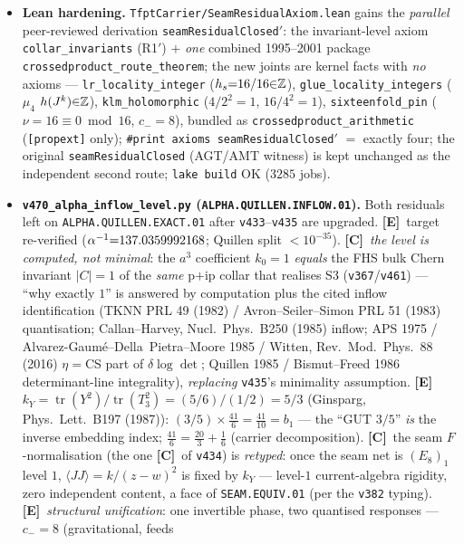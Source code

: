 \documentclass[11pt]{article}
\providecommand{\mE}{\textbf{[E]}}\providecommand{\mC}{\textbf{[C]}}
\begin{document}
\begin{itemize}
\item \textbf{Lean hardening.} \texttt{TfptCarrier/SeamResidualAxiom.lean} gains the \emph{parallel}
peer-reviewed derivation \texttt{seamResidualClosed$'$}: the invariant-level axiom
\texttt{collar\_invariants} (R1$'$) $+$ \emph{one} combined 1995--2001 package
\texttt{crossedproduct\_route\_theorem}; the new joints are kernel facts with \emph{no} axioms ---
\texttt{lr\_locality\_integer} ($h_s{=}16/16{\in}\mathbb{Z}$), \texttt{glue\_locality\_integers}
($\mu_4$ $h(J^k){\in}\mathbb{Z}$), \texttt{klm\_holomorphic} ($4/2^2{=}1$, $16/4^2{=}1$),
\texttt{sixteenfold\_pin} ($\nu{=}16{\equiv}0\bmod 16$, $c_-{=}8$), bundled as
\texttt{crossedproduct\_arithmetic} (\texttt{[propext]} only); \texttt{\#print axioms
seamResidualClosed$'$} $=$ exactly four; the original \texttt{seamResidualClosed} (AGT/AMT witness)
is kept unchanged as the independent second route; \texttt{lake build} OK ($3285$ jobs).
\item \textbf{\texttt{v470\_alpha\_inflow\_level.py} (\texttt{ALPHA.QUILLEN.INFLOW.01}).}
Both residuals left on \texttt{ALPHA.QUILLEN.EXACT.01} after \texttt{v433}--\texttt{v435} are
upgraded. \mE\ target re-verified ($\alpha^{-1}{=}137.0359992168$; Quillen split ${<}10^{-35}$).
\mC\ \emph{the level is computed, not minimal}: the $a^3$ coefficient $k_0{=}1$ \emph{equals} the
FHS bulk Chern invariant $|C|{=}1$ of the \emph{same} p$+$ip collar that realises S3
(\texttt{v367}/\texttt{v461}) --- ``why exactly $1$'' is answered by computation plus the cited
inflow identification (TKNN PRL 49 (1982) / Avron--Seiler--Simon PRL 51 (1983) quantisation;
Callan--Harvey, Nucl.\ Phys.\ B250 (1985) inflow; APS 1975 / Alvarez-Gaum\'e--Della~Pietra--Moore
1985 / Witten, Rev.\ Mod.\ Phys.\ 88 (2016) $\eta{=}$CS part of $\delta\log\det$; Quillen 1985 /
Bismut--Freed 1986 determinant-line integrality), \emph{replacing} \texttt{v435}'s minimality
assumption. \mE\ $k_Y{=}\operatorname{tr}(Y^2)/\operatorname{tr}(T_3^2){=}(5/6)/(1/2){=}5/3$
(Ginsparg, Phys.\ Lett.\ B197 (1987)): $(3/5){\times}\tfrac{41}{6}{=}\tfrac{41}{10}{=}b_1$ --- the
``GUT $3/5$'' \emph{is} the inverse embedding index; $\tfrac{41}{6}{=}\tfrac{20}{3}{+}\tfrac16$
(carrier decomposition). \mC\ the seam $F$-normalisation (the one \mC\ of \texttt{v434}) is
\emph{retyped}: once the seam net is $(E_8)_1$ level $1$, $\langle JJ\rangle{=}k/(z{-}w)^2$ is fixed
by $k_Y$ --- level-$1$ current-algebra rigidity, zero independent content, a face of
\texttt{SEAM.EQUIV.01} (per the \texttt{v382} typing). \mE\ \emph{structural unification}: one
invertible phase, two quantised responses --- $c_-{=}8$ (gravitational, feeds

\end{itemize}
\end{document}
